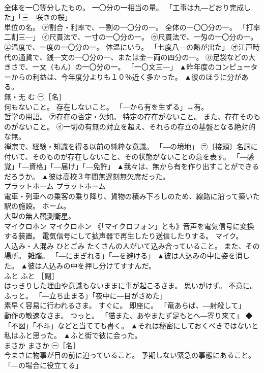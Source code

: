 \documentclass[8pt]{extreport}
\begin{document}
\begin{CJK}{UTF8}{min}
\\	全体を一〇等分したもの。 一〇分の一相当の量。 「工事は九―どおり完成した」「三―咲きの桜」 
\\	単位の名。 ㋐割合・利率で、一割の一〇分の一。 全体の一〇〇分の一。 「打率二割三―」 ㋑尺貫法で、一寸の一〇分の一。 ㋒尺貫法で、一匁の一〇分の一。 ㋓温度で、一度の一〇分の一。 体温にいう。 「七度八―の熱が出た」 ㋔江戸時代の通貨で、銭一文の一〇分の一、または金一両の四分の一。 ㋕足袋などの大きさで、一文（もん）の一〇分の一。 「一〇文三―」	▲昨年度のコンピューターからの利益は、今年度分よりも１０％近く多かった。 ▲彼のほうに分がある。
\\	無・无	む	㊀［名］ 
\\	何もないこと。 存在しないこと。 「―から有を生ずる」↔有。 
\\	哲学の用語。 ㋐存在の否定・欠如。 特定の存在がないこと。 また、存在そのものがないこと。 ㋑一切の有無の対立を超え、それらの存立の基盤となる絶対的な無。 
\\	禅宗で、経験・知識を得る以前の純粋な意識。 「―の境地」 ㊁〔接頭〕名詞に付いて、そのものが存在しないこと、その状態がないことの意を表す。 「―感覚」「―資格」「―届け」「―免許」	▲我々は、無から有を作り出すことができるだろうか。 ▲彼は高校３年間無遅刻無欠席だった。
\\	プラットホーム	プラットホーム	
\\	電車・列車への乗客の乗り降り、貨物の積み下ろしのため、線路に沿って築いた駅の施設。 ホーム。 
\\	大型の無人観測衛星。	
\\	マイクロホン	マイクロホン	《「マイクロフォン」とも》音声を電気信号に変換する装置。 電気信号にして拡声器で再生したり送信したりする。 マイク。	
\\	人込み・人混み	ひとごみ	たくさんの人がいて込み合っていること。 また、その場所。 雑踏。 「―にまぎれる」「―を避ける」	▲彼は人込みの中に姿を消した。 ▲彼は人込みの中を押し分けてすすんだ。
\\	ふと	ふと	［副］ 
\\	はっきりした理由や意識もないままに事が起こるさま。 思いがけず。 不意に。 ふっと。 「―立ち止まる」「夜中に―目がさめた」 
\\	素早く容易に行われるさま。 すぐに。 即座に。 「竜あらば、―射殺して」 
\\	動作の敏速なさま。 つっと。 「猫また、あやまたず足もとへ―寄り来て」 ◆「不図」「不斗」などと当てても書く。	▲それは秘密にしておくべきではないと私はふと思った。 ▲ふと街で彼に会った。
\\	まさか	まさか	㊀［名］ 
\\	今まさに物事が目の前に迫っていること。 予期しない緊急の事態にあること。 「―の場合に役立てる」 

\end{CJK}
\end{document}
